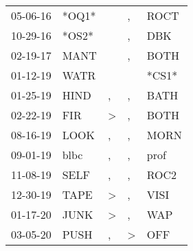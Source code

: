 \begin{supertabular}{p{0.07\textwidth}p{0.06\textwidth}p{0.02\textwidth}p{0.02\textwidth}p{0.06\textwidth}}
 05-06-16\textsuperscript{} &                   *OQ1* &               &             , &  ROCT\textsuperscript{} \\
 10-29-16\textsuperscript{} &                   *OS2* &               &             , &   DBK\textsuperscript{} \\
 02-19-17\textsuperscript{} &  MANT\textsuperscript{} &               &             , &  BOTH\textsuperscript{} \\
 01-12-19\textsuperscript{} &  WATR\textsuperscript{} &               &               &                   *CS1* \\
 01-25-19\textsuperscript{} &  HIND\textsuperscript{} &             , &             , &  BATH\textsuperscript{} \\
 02-22-19\textsuperscript{} &   FIR\textsuperscript{} &  \textgreater &             , &  BOTH\textsuperscript{} \\
 08-16-19\textsuperscript{} &  LOOK\textsuperscript{} &             , &             , &  MORN\textsuperscript{} \\
 09-01-19\textsuperscript{} &  blbc\textsuperscript{} &             , &             , &  prof\textsuperscript{} \\
 11-08-19\textsuperscript{} &  SELF\textsuperscript{} &             , &             , &  ROC2\textsuperscript{} \\
 12-30-19\textsuperscript{} &  TAPE\textsuperscript{} &  \textgreater &             , &  VISI\textsuperscript{} \\
 01-17-20\textsuperscript{} &  JUNK\textsuperscript{} &  \textgreater &             , &   WAP\textsuperscript{} \\
 03-05-20\textsuperscript{} &  PUSH\textsuperscript{} &             , &  \textgreater &   OFF\textsuperscript{} \\
\end{supertabular}
